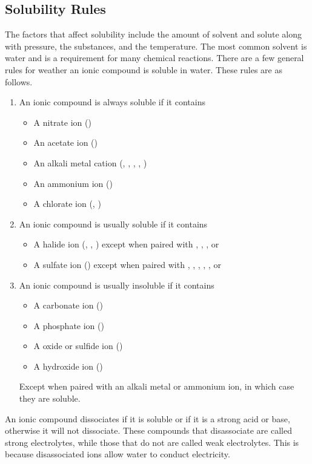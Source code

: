 \subsection{Solubility Rules}
The factors that affect solubility include the amount of solvent and solute along with pressure, the substances, and the temperature. The most common solvent is water and is a requirement for many chemical reactions. There are a few general rules for weather an ionic compound is soluble in water. These rules are as follows.
\begin{enumerate}
    \item An ionic compound is always soluble if it contains
    \begin{itemize}
        \item A nitrate ion ()
        \item An acetate ion ()
        \item An alkali metal cation (, , , , )
        \item An ammonium ion ()
        \item A chlorate ion (, )
    \end{itemize}
    \item An ionic compound is usually soluble if it contains
    \begin{itemize}
        \item A halide ion (, , ) except when paired with , , , or 
        \item A sulfate ion () except when paired with , , , , , or 
    \end{itemize}
    \item An ionic compound is usually insoluble if it contains
    \begin{itemize}
        \item A carbonate ion ()
        \item A phosphate ion ()
        \item A oxide or sulfide ion ()
        \item A hydroxide ion ()
    \end{itemize}
    Except when paired with an alkali metal or ammonium ion, in which case they are soluble.
\end{enumerate}

An ionic compound dissociates if it is soluble or if it is a strong acid or base, otherwise it will not dissociate. These compounds that disassociate are called strong electrolytes, while those that do not are called weak electrolytes. This is because disassociated ions allow water to conduct electricity. 
